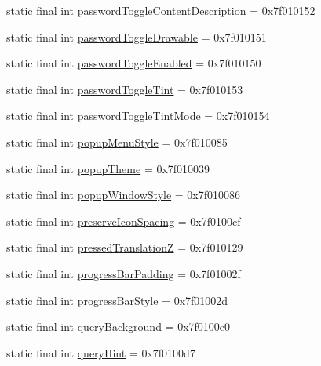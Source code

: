 \begin{CompactItemize}
\item 
static final int \hyperlink{classandroid_1_1support_1_1coreutils_1_1_r_1_1attr_4f4298abe0e3e37183cc8a370b2fde6a}{passwordToggleContentDescription} = 0x7f010152
\item 
static final int \hyperlink{classandroid_1_1support_1_1coreutils_1_1_r_1_1attr_6577d39ad59dd3f2aa957d967aa43d56}{passwordToggleDrawable} = 0x7f010151
\item 
static final int \hyperlink{classandroid_1_1support_1_1coreutils_1_1_r_1_1attr_14163089d3eda437a792329232773098}{passwordToggleEnabled} = 0x7f010150
\item 
static final int \hyperlink{classandroid_1_1support_1_1coreutils_1_1_r_1_1attr_5c66dc2ab14aeb48bec47f94d009af8d}{passwordToggleTint} = 0x7f010153
\item 
static final int \hyperlink{classandroid_1_1support_1_1coreutils_1_1_r_1_1attr_098cd30acf9d6190c67bf369e67c912d}{passwordToggleTintMode} = 0x7f010154
\item 
static final int \hyperlink{classandroid_1_1support_1_1coreutils_1_1_r_1_1attr_f3e50d0021f11e1233f7d5b1b6b16ef3}{popupMenuStyle} = 0x7f010085
\item 
static final int \hyperlink{classandroid_1_1support_1_1coreutils_1_1_r_1_1attr_558addf3755d1919c7add9fbe35d2d6a}{popupTheme} = 0x7f010039
\item 
static final int \hyperlink{classandroid_1_1support_1_1coreutils_1_1_r_1_1attr_766cc5d736f71f6960a9e2333d38bfa3}{popupWindowStyle} = 0x7f010086
\item 
static final int \hyperlink{classandroid_1_1support_1_1coreutils_1_1_r_1_1attr_9c06cb95721f2016e98e2d1f3ecd06e7}{preserveIconSpacing} = 0x7f0100cf
\item 
static final int \hyperlink{classandroid_1_1support_1_1coreutils_1_1_r_1_1attr_a448c5d0b628ccf8f565e5d06d97826e}{pressedTranslationZ} = 0x7f010129
\item 
static final int \hyperlink{classandroid_1_1support_1_1coreutils_1_1_r_1_1attr_8293caa75e2acf7e59f852685af2b698}{progressBarPadding} = 0x7f01002f
\item 
static final int \hyperlink{classandroid_1_1support_1_1coreutils_1_1_r_1_1attr_7485e34db433e63ba7a91a98da986226}{progressBarStyle} = 0x7f01002d
\item 
static final int \hyperlink{classandroid_1_1support_1_1coreutils_1_1_r_1_1attr_0f61ffeb4925e3804af58e22c73a491b}{queryBackground} = 0x7f0100e0
\item 
static final int \hyperlink{classandroid_1_1support_1_1coreutils_1_1_r_1_1attr_fa0edd1787f5ff90be88af42c1a7f5ca}{queryHint} = 0x7f0100d7

\end{CompactItemize}
